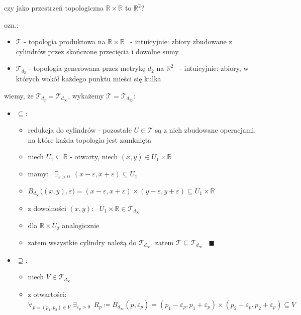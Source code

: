 \documentclass[a4paper,12pt]{article}
\begin{document}
\bigskip
{} \; czy jako przestrzeń topologiczna \(\mathbb{R} \times \mathbb{R}\) to \(\mathbb{R}^2\)?

\smallskip
ozn.:
\begin{itemize}
    \item \(\mathcal{T}\) - topologia produktowa na \(\mathbb{R} \times \mathbb{R}\) \, - intuicyjnie: zbiory zbudowane z cylindrów przez skończone przecięcia i dowolne sumy
    \item \(\mathcal{T}_{d_2}\) - topologia generowana przez metrykę \(d_2\) na \(\mathbb{R}^2\) \, - intuicyjnie: zbiory, w których wokół każdego punktu mieści się kulka
\end{itemize}
\smallskip
wiemy, że \(\mathcal{T}_{d_2} = \mathcal{T}_{d_\infty}\), \; wykażemy \(\mathcal{T} = \mathcal{T}_{d_\infty}\):
\begin{itemize}
    \item \(\subseteq\):
    \begin{itemize}
        \item redukcja do cylindrów - pozostałe \(U \in \mathcal{T}\) są z nich zbudowane operacjami, na które każda topologia jest zamknięta
        \item niech \(U_1 \subseteq \mathbb{R}\) - otwarty, \; niech \((x, y) \in U_1 \times \mathbb{R}\)
        \item mamy: \, \(\exists_{\varepsilon > 0} \;\, (x - \varepsilon, x + \varepsilon) \subseteq U_1\)
        \item \(B_{d_\infty}\big((x, y), \varepsilon\big) = (x - \varepsilon, x + \varepsilon) \times (y - \varepsilon, y + \varepsilon) \subseteq U_1 \times \mathbb{R}\)
        \item z dowolności \((x, y)\): \, \(U_1 \times \mathbb{R} \in \mathcal{T}_{d_\infty}\)
        \item dla \(\mathbb{R} \times U_2\) analogicznie
        \item zatem wszystkie cylindry należą do \(\mathcal{T}_{d_\infty}\), zatem \(\mathcal{T} \subseteq \mathcal{T}_{d_\infty}\) \, \(\blacksquare\)
    \end{itemize}
    \item \(\supseteq\):
    \begin{itemize}
        \item niech \(V \in \mathcal{T}_{d_\infty}\)
        \item z otwartości: \, \(\forall_{p = (p_1, p_2) \in V} \; \exists_{\varepsilon_p > 0} \;\, R_p \coloneqq B_{d_\infty}(p, \varepsilon_p) = (p_1 - \varepsilon_p, p_1 + \varepsilon_p) \times (p_2 - \varepsilon_p, p_2 + \varepsilon_p) \subseteq V\)

\end{itemize}
\end{itemize}
\end{document}
